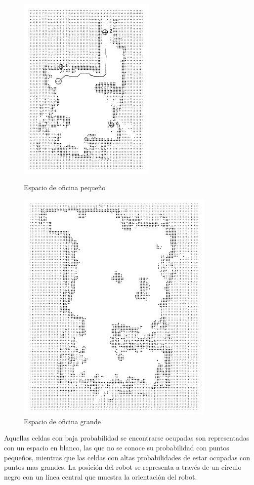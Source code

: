 \documentclass[11pt]{article}
\begin{document}
\begin{figure}[ht]
	\centering
	\begin{minipage}[]{0.45\linewidth}
		\includegraphics{images/small_office.JPG}
		\caption{Espacio de oficina pequeño}
		\label{fig:small_office_map}
	\end{minipage}
	\quad
	\begin{minipage}[scale=0.]{0.45\linewidth}
		\includegraphics{images/large_office.JPG}
		\caption{Espacio de oficina grande}
		\label{fig:large_office_map}
	\end{minipage}
\end{figure}

Aquellas celdas con baja probabilidad se encontrarse ocupadas son representadas con un espacio en blanco, las que no se conoce su probabilidad con puntos pequeños, mientras que las celdas con altas probabilidades de estar ocupadas con puntos mas grandes. La posición del robot se representa a través de un círculo negro con un línea central que muestra la orientación del robot.
\end{document}
